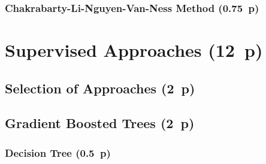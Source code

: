 \subsubsection{Chakrabarty-Li-Nguyen-Van-Ness
  Method (0.75~p)}\label{sec:chakarabarty-li-nguyen-van-ness-method}

\newpage
\section{Supervised Approaches (12~p)}\label{sec:supervised-approaches}

\subsection{Selection of Approaches (2~p)}\label{sec:selection-of-approaches}

\subsection{Gradient Boosted Trees (2~p)}\label{sec:gradient-boosted-trees}

\subsubsection{Decision Tree (0.5~p)}\label{sec:decision-tree}



